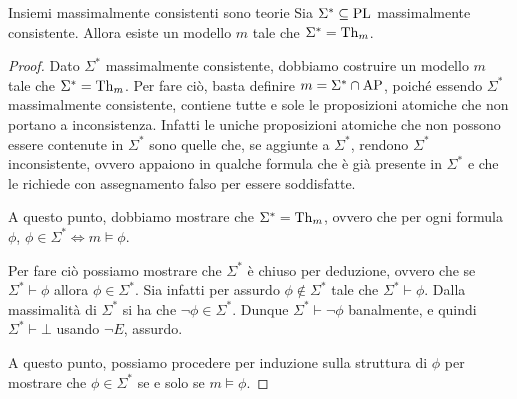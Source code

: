 \begin{proposition}[label=prop:max-consistent-set-are-theory]{Insiemi massimalmente consistenti sono teorie}
  Sia \(\Sigma^* \subseteq \operatorname{PL}\) massimalmente consistente. Allora esiste un modello \(m\) tale che \(\Sigma^* = \operatorname{Th}_{m}\).
\end{proposition}

\begin{proof}
  Dato \(\Sigma^*\) massimalmente consistente, dobbiamo costruire un modello \(m\) tale che \(\Sigma^* = \operatorname{Th}_{m}\).
  Per fare ciò, basta definire \(m = \Sigma^*\cap\AP\), poiché essendo \(\Sigma^*\) massimalmente consistente, contiene tutte e sole le proposizioni atomiche che non portano a inconsistenza.
  Infatti le uniche proposizioni atomiche che non possono essere contenute in \(\Sigma^*\) sono quelle che, se aggiunte a \(\Sigma^*\), rendono \(\Sigma^*\) inconsistente, ovvero appaiono in qualche formula che è già presente in \(\Sigma^*\) e che le richiede con assegnamento falso per essere soddisfatte.

  A questo punto, dobbiamo mostrare che \(\Sigma^* = \operatorname{Th}_{m}\), ovvero che per ogni formula \(\phi\), \(\phi \in \Sigma^* \iff m \models \phi\).

  Per fare ciò possiamo mostrare che \(\Sigma^*\) è chiuso per deduzione, ovvero che se \(\Sigma^*\vdash\phi\) allora \(\phi\in\Sigma^*\).
  Sia infatti per assurdo \(\phi\not\in\Sigma^*\) tale che \(\Sigma^*\vdash\phi\). Dalla massimalità di \(\Sigma^*\) si ha che \(\neg\phi\in\Sigma^*\). Dunque \(\Sigma^*\vdash\neg\phi\) banalmente, e quindi \(\Sigma^*\vdash\bot\) usando \(\neg E\), assurdo.

  A questo punto, possiamo procedere per induzione sulla struttura di \(\phi\) per mostrare che \(\phi \in \Sigma^*\) se e solo se \(m\models\phi\).


\end{proof}
